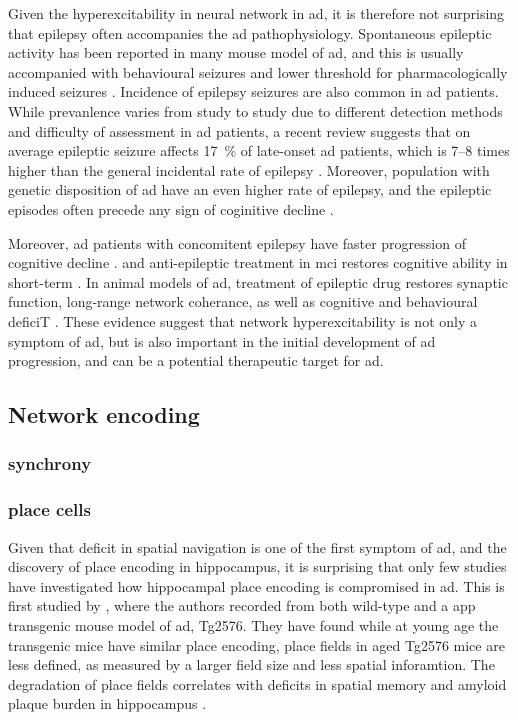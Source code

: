 Given the hyperexcitability in neural network in \gls{ad}, it is therefore not surprising that epilepsy often accompanies the \gls{ad} pathophysiology.  Spontaneous epileptic activity has been reported in many mouse model of \gls{ad}, and this is usually accompanied with behavioural seizures and lower threshold for pharmacologically induced seizures \citep{palop07, um12, ittner10}. Incidence of epilepsy seizures are also common in \gls{ad} patients. While prevanlence varies from study to study due to different detection methods and difficulty of assessment in \gls{ad} patients, a recent review suggests that on average epileptic seizure affects \SI{17}{\percent} of late-onset \gls{ad} patients, which is 7--8 times higher than the general incidental rate of epilepsy \citep{amatniek06, horvath16}. Moreover, population with genetic disposition of \gls{ad} have an even higher rate of epilepsy, and the epileptic episodes often precede any sign of coginitive decline \citep{moehlmann02,cabrejo06,mcnaughton12}. 

Moreover, \gls{ad} patients with concomitent epilepsy have faster progression of cognitive decline \citep{vossel13, bakker15}. and anti-epileptic treatment in \gls{mci} restores cognitive ability in short-term \citep{bakker15}.  In animal models of \gls{ad}, treatment of epileptic drug restores synaptic function, long-range network coherance, as well as cognitive and behavioural deficiT \citep{sanchez12, busche15}. These evidence suggest that network hyperexcitability is not only a symptom of \gls{ad}, but is also important in the initial development of \gls{ad} progression, and can be a potential therapeutic target for \gls{ad}.

\subsection{Network encoding}
\subsubsection{synchrony}
\citep{goutagny13}
\subsubsection{place cells}
Given that deficit in spatial navigation is one of the first symptom of \gls{ad}, and the discovery of place encoding in hippocampus, it is surprising that only few studies have investigated how hippocampal place encoding is compromised in \gls{ad}. This is first studied by \citet{cacucci08}, where the authors recorded from both wild-type and a \gls{app} transgenic mouse model of \gls{ad}, Tg2576. They have found while at young age the transgenic mice have similar place encoding, place fields in aged Tg2576 mice are less defined, as measured by a larger field size and less spatial inforamtion. The degradation of place fields correlates with deficits in spatial memory and amyloid plaque burden in hippocampus \citep{cacucci08}.

